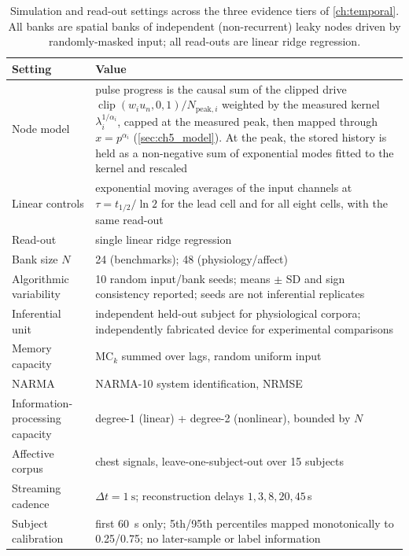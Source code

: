 \begin{table}[t]
  \centering
  \caption[Reservoir simulation and read-out settings]{Simulation and read-out settings across the three evidence tiers of \cref{ch:temporal}. All banks are spatial banks of independent (non-recurrent) leaky nodes driven by randomly-masked input; all read-outs are linear ridge regression.}
  \label{tab:ch5_settings}
  \footnotesize
  \setlength{\tabcolsep}{5pt}
  \begin{tabularx}{\linewidth}{@{}>{\raggedright\arraybackslash}p{3.4cm}X@{}}
    \toprule
    Setting & Value \\
    \midrule
    Node model & pulse progress is the causal sum of the clipped drive $\operatorname{clip}(w_i u_n,0,1)/N_{\mathrm{peak},i}$ weighted by the measured kernel $\lambda_i^{1/\alpha_i}$, capped at the measured peak, then mapped through $x=p^{\alpha_i}$ (\cref{sec:ch5_model}). At the peak, the stored history is held as a non-negative sum of exponential modes fitted to the kernel and rescaled \\
    Linear controls & exponential moving averages of the input channels at $\tau=t_{1/2}/\ln 2$ for the lead cell and for all eight cells, with the same read-out \\
    Read-out & single linear ridge regression \\
    Bank size $N$ & 24 (benchmarks); 48 (physiology/affect) \\
    Algorithmic variability & 10 random input/bank seeds; means $\pm$ SD and sign consistency reported; seeds are not inferential replicates \\
    Inferential unit & independent held-out subject for physiological corpora; independently fabricated device for experimental comparisons \\
    Memory capacity & $\mathrm{MC}_k$ summed over lags, random uniform input \cite{Jaeger2002STM} \\
    NARMA & NARMA-10 system identification, NRMSE \cite{AtiyaParlos2000} \\
    Information-processing capacity & degree-1 (linear) + degree-2 (nonlinear), bounded by $N$ \cite{Dambre2012} \\
    Affective corpus & \WESAD{} chest signals, leave-one-subject-out over 15 subjects \cite{Schmidt2018WESAD} \\
    Streaming cadence & $\Delta t=\SI{1}{\second}$; reconstruction delays $1,3,8,20,45$\,s \\
    Subject calibration & first \SI{60}{\second} only; 5th/95th percentiles mapped monotonically to 0.25/0.75; no later-sample or label information \\

\end{tabularx}
\end{table}
